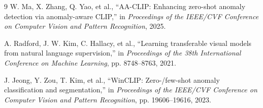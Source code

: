 \documentclass[a4paper,10pt]{article}
\begin{document}
\begin{thebibliography}{9}
\small
{}
W. Ma, X. Zhang, Q. Yao, et al., ``AA-CLIP: Enhancing zero-shot anomaly detection via anomaly-aware CLIP,'' in \emph{Proceedings of the IEEE/CVF Conference on Computer Vision and Pattern Recognition}, 2025.

A. Radford, J. W. Kim, C. Hallacy, et al., ``Learning transferable visual models from natural language supervision,'' in \emph{Proceedings of the 38th International Conference on Machine Learning}, pp. 8748--8763, 2021.

J. Jeong, Y. Zou, T. Kim, et al., ``WinCLIP: Zero-/few-shot anomaly classification and segmentation,'' in \emph{Proceedings of the IEEE/CVF Conference on Computer Vision and Pattern Recognition}, pp. 19606--19616, 2023.
\end{thebibliography}
\end{document}
